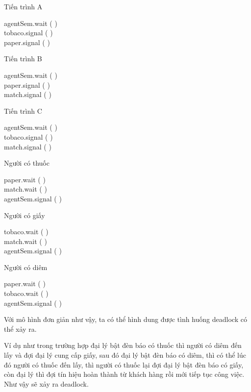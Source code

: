 \documentclass[a4paper]{article}
\begin{document}
	\begin{center}
	Tiến trình A
	\begin{tcolorbox}
		agentSem.wait ( ) \\
		tobaco.signal ( ) \\
		paper.signal ( )
	\end{tcolorbox} 
	\end{center}
	\begin{center}
	{Tiến trình B}
	\begin{tcolorbox}
		agentSem.wait ( ) \\
		paper.signal ( ) \\
		match.signal ( )
	\end{tcolorbox} 
	\end{center}
	\begin{center}
	{Tiến trình C}
	\begin{tcolorbox}
		agentSem.wait ( ) \\
		tobaco.signal ( ) \\
		match.signal ( )
	\end{tcolorbox}	
	\end{center}
	
	\begin{center}
		Người có thuốc
		\begin{tcolorbox}
		paper.wait ( ) \\
		match.wait ( ) \\ 
		agentSem.signal ( ) 
		\end{tcolorbox}
	\end{center}
	\begin{center}
		Người có giấy
		\begin{tcolorbox}
		tobaco.wait ( ) \\
		match.wait ( ) \\ 
		agentSem.signal ( ) 
		\end{tcolorbox}
	\end{center}
	\begin{center}
		Người có diêm
		\begin{tcolorbox}
		paper.wait ( ) \\
		tobaco.wait ( ) \\ 
		agentSem.signal ( ) 
		\end{tcolorbox}
	\end{center}
	
	
	Với mô hình đơn giản như vậy, ta có thể hình dung được tình huống deadlock có thể xảy ra. 
	
	
	Ví dụ như trong trường hợp đại lý bật đèn báo có thuốc thì người có diêm đến lấy và đợi đại lý 
	cung cấp giấy, sau đó đại lý bật đèn báo có diêm, thì có thể lúc đó người có thuốc đến lấy,
	thì người có thuốc lại đợi đại lý bật đèn báo có giấy, còn đại lý thì đợi tín hiệu hoàn thành từ 
	khách hàng rồi mới tiếp tục công việc. Như vậy sẽ xảy ra deadlock.
\end{document}
